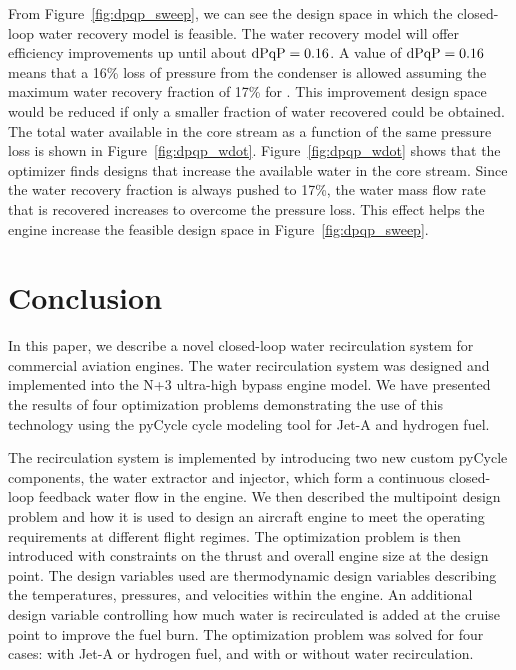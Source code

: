 \documentclass[conf]{new-aiaa}
\begin{document}
From Figure~\ref{fig:dpqp_sweep}, we can see the design space in which the closed-loop water recovery model is feasible.
The water recovery model will offer efficiency improvements up until about $\rm{dPqP} = 0.16$.
A value of $\rm{dPqP} = 0.16$ means that a 16\% loss of pressure from the condenser is allowed assuming the maximum water recovery fraction of 17\% for .
This improvement design space would be reduced if only a smaller fraction of water recovered could be obtained.
The total water available in the core stream as a function of the same pressure loss is shown in Figure~\ref{fig:dpqp_wdot}.
Figure~\ref{fig:dpqp_wdot} shows that the optimizer finds designs that increase the available water in the core stream.
Since the water recovery fraction is always pushed to 17\%, the water mass flow rate that is recovered increases to overcome the pressure loss.
This effect helps the engine increase the feasible design space in Figure~\ref{fig:dpqp_sweep}.


\section{Conclusion}
\label{sec:conc}
In this paper, we describe a novel closed-loop water recirculation system for commercial aviation engines.
The water recirculation system was designed and implemented into the N+3 ultra-high bypass engine model.
We have presented the results of four optimization problems demonstrating the use of this technology using the pyCycle cycle modeling tool for Jet-A and hydrogen fuel.

The recirculation system is implemented by introducing two new custom pyCycle components, the water extractor and injector, which form a continuous closed-loop feedback water flow in the engine.
We then described the multipoint design problem and how it is used to design an aircraft engine to meet the operating requirements at different flight regimes.
The optimization problem is then introduced with constraints on the thrust and overall engine size at the design point.
The design variables used are thermodynamic design variables describing the temperatures, pressures, and velocities within the engine.
An additional design variable controlling how much water is recirculated is added at the cruise point to improve the fuel burn.
The optimization problem was solved for four cases: with Jet-A or hydrogen fuel, and with or without water recirculation.
\end{document}

